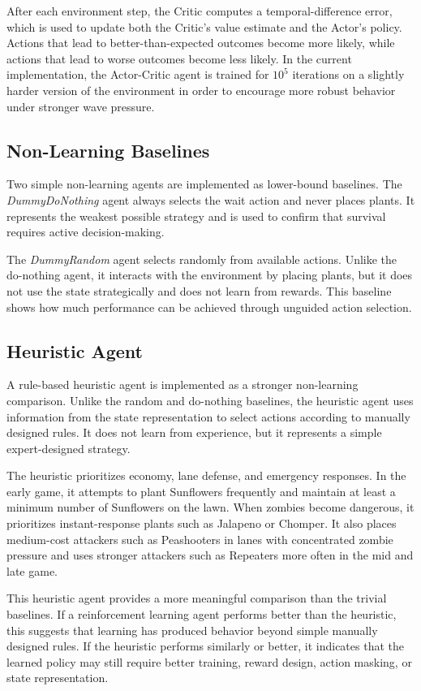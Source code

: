 \documentclass[conference,onecolumn]{IEEEtran}
\begin{document}
After each environment step, the Critic computes a temporal-difference error, which is used to update both the Critic's value estimate and the Actor's policy. Actions that lead to better-than-expected outcomes become more likely, while actions that lead to worse outcomes become less likely. In the current implementation, the Actor-Critic agent is trained for $10^5$ iterations on a slightly harder version of the environment in order to encourage more robust behavior under stronger wave pressure.

\subsection{Non-Learning Baselines}

Two simple non-learning agents are implemented as lower-bound baselines. The \textit{DummyDoNothing} agent always selects the wait action and never places plants. It represents the weakest possible strategy and is used to confirm that survival requires active decision-making.

The \textit{DummyRandom} agent selects randomly from available actions. Unlike the do-nothing agent, it interacts with the environment by placing plants, but it does not use the state strategically and does not learn from rewards. This baseline shows how much performance can be achieved through unguided action selection.

\subsection{Heuristic Agent}

A rule-based heuristic agent is implemented as a stronger non-learning comparison. Unlike the random and do-nothing baselines, the heuristic agent uses information from the state representation to select actions according to manually designed rules. It does not learn from experience, but it represents a simple expert-designed strategy.

The heuristic prioritizes economy, lane defense, and emergency responses. In the early game, it attempts to plant Sunflowers frequently and maintain at least a minimum number of Sunflowers on the lawn. When zombies become dangerous, it prioritizes instant-response plants such as Jalapeno or Chomper. It also places medium-cost attackers such as Peashooters in lanes with concentrated zombie pressure and uses stronger attackers such as Repeaters more often in the mid and late game.

This heuristic agent provides a more meaningful comparison than the trivial baselines. If a reinforcement learning agent performs better than the heuristic, this suggests that learning has produced behavior beyond simple manually designed rules. If the heuristic performs similarly or better, it indicates that the learned policy may still require better training, reward design, action masking, or state representation.
\end{document}
